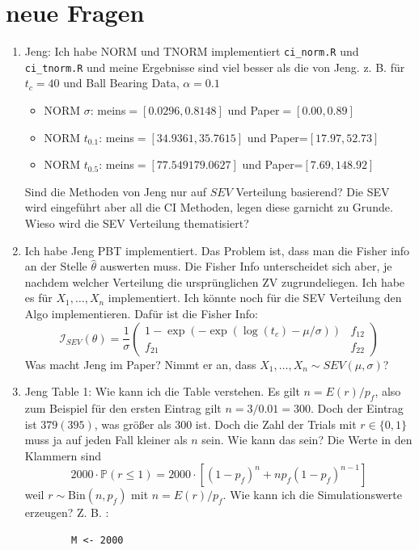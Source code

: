 \newpage

\section{neue Fragen}




\begin{enumerate}

	\item 
	Jeng: Ich habe NORM und TNORM implementiert \texttt{ci\_norm.R} und \texttt{ci\_tnorm.R} und meine Ergebnisse sind viel besser als die von Jeng. z. B. für $t_c = 40$ und Ball Bearing Data, $\alpha = 0.1$
	\begin{itemize}
		\item NORM $\sigma$: meins$=[0.0296, 0.8148]$ und Paper$=[0.00, 0.89]$
		\item NORM $t_{0.1}$: meins$= [34.9361, 35.7615]$ und Paper=$[17.97, 52.73]$
		\item NORM $t_{0.5}$: meins$= [77.5491 79.0627]$ und Paper=$[7.69, 148.92]$
	\end{itemize}
	Sind die Methoden von Jeng nur auf $SEV$ Verteilung basierend? Die SEV wird eingeführt aber all die CI Methoden, legen diese garnicht zu Grunde. Wieso wird die SEV Verteilung thematisiert?
	\item 
	Ich habe Jeng PBT implementiert. Das Problem ist, dass man die Fisher info an der Stelle $\hat \theta$ auswerten muss. Die Fisher Info unterscheidet sich aber, je nachdem welcher Verteilung die ursprünglichen ZV zugrundeliegen. Ich habe es für $X_1, \ldots , X_n$ implementiert. Ich könnte noch für die SEV Verteilung den Algo implementieren. Dafür ist die Fisher Info:
	\[
	\mathcal I_{SEV}(\theta) = \frac{1}{\sigma} \begin{pmatrix}
		1 - \exp(- \exp(\log(t_c) - \mu / \sigma)) & f_{12}\\
		f_{21} & f_{22}
	\end{pmatrix}
	\]
	Was macht Jeng im Paper? Nimmt er an, dass $X_1, \ldots , X_n \sim SEV(\mu, \sigma)$? 
	\item 
	Jeng Table 1:
	Wie kann ich die Table verstehen. Es gilt $n = E(r) / p_f$, also zum Beispiel für den ersten Eintrag gilt $n = 3 / 0.01 = 300$. Doch der Eintrag ist $379(395)$, was größer als $300$ ist. Doch die Zahl der Trials mit $r \in \{0, 1\}$ muss ja auf jeden Fall kleiner als $n$ sein. Wie kann das sein?
	Die Werte in den Klammern sind 
	\[
	2000 \cdot \mathbb{P} \left( r \leq 1 \right)
	=
	2000 \cdot \left[ (1 - p_f)^{n} + n p_f (1- p_f)^{n-1} \right]
	\]
	weil $r \sim \text{Bin}(n, p_f)$ mit $n = E(r) / p_f$. Wie kann ich die Simulationswerte erzeugen? Z. B. :
	\begin{verbatim}
		M <- 2000
		

\end{verbatim}
\end{enumerate}
